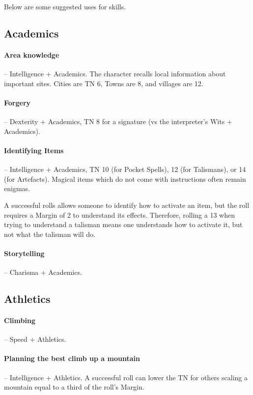 \begin{multicols}{2}

\noindent
Below are some suggested uses for skills.

\subsection{Academics}

\paragraph{Area knowledge } -- Intelligence + Academics.
The character recalls local information about important sites.
Cities are TN 6, Towns are 8, and villages are 12.

\paragraph{Forgery} -- Dexterity + Academics, TN 8 for a signature (vs the interpreter's Wits + Academics).

\label{magicidentification}
\paragraph{Identifying Items} -- Intelligence + Academics, TN 10 (for Pocket Spells), 12 (for Talismans), or 14 (for Artefacts).
Magical items which do not come with instructions often remain enigmas.

A successful rolls allows someone to identify how to activate an item, but the roll requires a Margin of 2 to understand its effects.
Therefore, rolling a 13 when trying to understand a talisman means one understands how to activate it, but not what the talisman will do.

\paragraph{Storytelling} -- Charisma + Academics.

\subsection{Athletics}

\paragraph{Climbing} -- Speed + Athletics.

\paragraph{Planning the best climb up a mountain} -- Intelligence + Athletics.
A successful roll can lower the TN for others scaling a mountain equal to a third of the roll's Margin.


\end{multicols}
